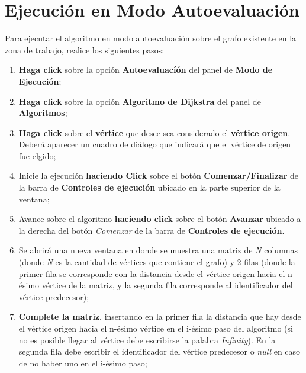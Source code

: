 \documentclass{book}
\begin{document}
\section{Ejecución en Modo Autoevaluación}

Para ejecutar el algoritmo en modo autoevaluación sobre el grafo existente en la zona de trabajo, realice los siguientes pasos:
\medskip

\begin{enumerate}
	\itemsep=8pt \topsep=0pt \partopsep=0pt \parskip=0pt \parsep=0pt

	\item \textbf{Haga click} sobre la opción \textbf{Autoevaluacíón} del panel de \textbf{Modo de Ejecución};

	\item \textbf{Haga click} sobre la opción \textbf{Algoritmo de Dijkstra} del panel de \textbf{Algoritmos};

	\item \textbf{Haga click} sobre el \textbf{vértice} que desee sea considerado el \textbf{vértice origen}. Deberá aparecer un cuadro de diálogo que indicará que el vértice de origen fue elgido;

	\item Inicie la ejecución \textbf{haciendo Click} sobre el botón \textbf{Comenzar/Finalizar} de la barra de \textbf{Controles de ejecución} ubicado en la parte superior de la ventana;

	\item Avance sobre el algoritmo \textbf{haciendo click} sobre el botón \textbf{Avanzar} ubicado a la derecha del botón \textit{Comenzar} de la barra de \textbf{Controles de ejecución}.

	\item Se abrirá una nueva ventana en donde se muestra una matriz de \textit{N} columnas (donde \textit{N} es la cantidad de vértices que contiene el grafo) y 2 filas (donde la primer fila se corresponde con la distancia desde el vértice origen hacia el n-ésimo vértice de la matriz, y la segunda fila corresponde al identificador del vértice predecesor);

	\item \textbf{Complete la matriz}, insertando en la primer fila la distancia que hay desde el vértice origen hacia el n-ésimo vértice en el i-ésimo paso del algoritmo (si no es posible llegar al vértice debe escribirse la palabra \textit{Infinity}). En la segunda fila debe escribir el identificador del vértice predecesor o \textit{null} en caso de no haber uno en el i-ésimo paso;


\end{enumerate}
\end{document}
